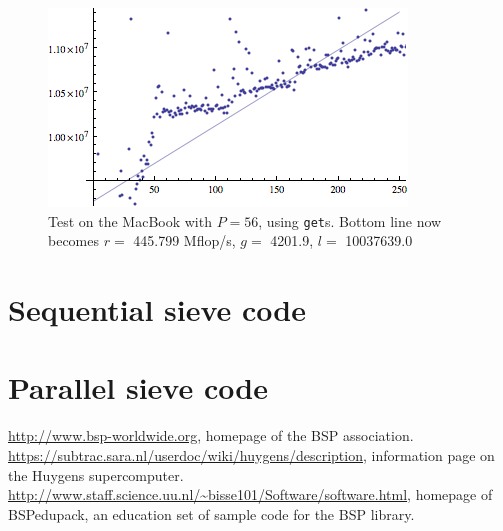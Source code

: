 \documentclass[a4paper]{article}
\begin{document}
\begin{figure}[h]
    \begin{center}
        \includegraphics{img/bench-laptop-get-p56.png}
    \end{center}
    \caption{Test on the MacBook with $P=56$, using \texttt{get}s. Bottom line
    now becomes $r=$ 445.799 Mflop/s, $g=$ 4201.9, $l=$ 10037639.0}
    \label{fig:bench-laptop-get-p56}
\end{figure}



\appendix
\section{Sequential sieve code}


\section{Parallel sieve code}



\begin{thebibliography}{99}
     \url{http://www.bsp-worldwide.org}, homepage of the BSP
        association. 
        \url{https://subtrac.sara.nl/userdoc/wiki/huygens/description},
        information page on the Huygens supercomputer. 
        \url{http://www.staff.science.uu.nl/~bisse101/Software/software.html}, homepage of BSPedupack, an education set of sample code for the
        BSP library. 
\end{thebibliography}
\end{document}
